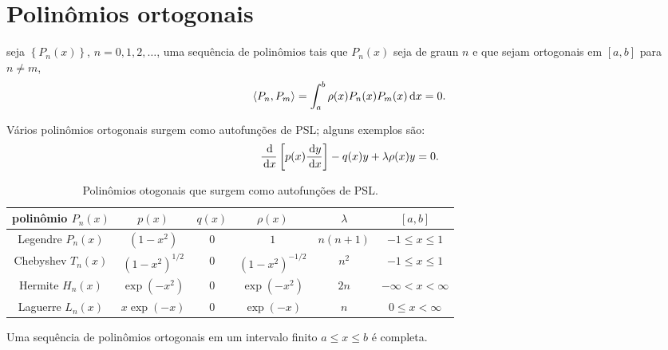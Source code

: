 \section{Polinômios ortogonais}
seja $\left\{ P_n(x) \right\}$, $n = 0, 1, 2, \ldots$, uma sequência de
polinômios tais que $P_n(x)$ seja de graun $n$ e que sejam ortogonais em $[a,b]$
para $n \neq m$,
\begin{dmath*}
  \langle P_n, P_m \rangle = \int_a^b \rho(x) P_n(x) P_m(x) \id{x} = 0.
\end{dmath*}
\begin{exem}
  Vários polinômios ortogonais surgem como autofunções de PSL; alguns exemplos
  são:
  \begin{dmath*}
    \frac{\id{}}{\id{x}}\left[ p(x) \frac{\id{y}}{\id{x}} \right] - q(x) y +
    \lambda \rho(x) y = 0.
  \end{dmath*}
\end{exem}
\begin{table}[!htb]
  \centering
  \caption{Polinômios otogonais que surgem como autofunções de PSL.}
  \label{tab:pol_ort_PSL}
  \begin{tabular}{|c|c|c|c|c|c|}
    \hline
    polinômio $P_n(x)$ & $p(x)$ & $q(x)$ & $\rho(x)$ & $\lambda$ & $[a,b]$ \\ \hline
    Legendre $P_n(x)$ & $\left( 1 - x^2 \right)$ & $0$ & $1$ & $n \left( n + 1 \right)$ & $-1 \leq x \leq 1$ \\ \hline
    Chebyshev $T_n(x)$ & $\left( 1 - x^2 \right)^{1/2}$ & $0$ & $\left( 1 - x^2 \right)^{-1/2}$ & $n^2$ & $-1 \leq x \leq 1$ \\ \hline
    Hermite $H_n(x)$ & $\exp(-x^2)$ & $0$ & $\exp(-x^2)$ & $2n$ & $-\infty < x < \infty$ \\ \hline
    Laguerre $L_n(x)$ & $x \exp(-x)$ & $0$ & $\exp(-x)$ & $n$ & $0 \leq x < \infty$ \\ \hline
  \end{tabular}
\end{table}
\begin{teo}
  Uma sequência de polinômios ortogonais em um intervalo finito $a \leq x \leq
  b$ é completa.
\end{teo}
